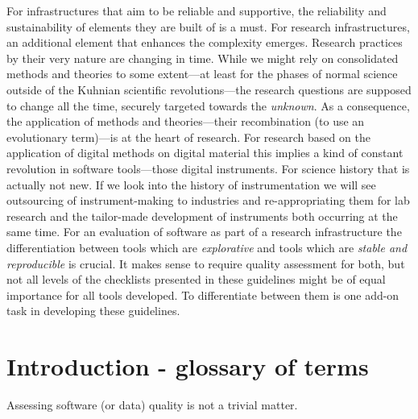 \documentclass[a4paper,11pt]{article}
\begin{document}
For infrastructures that aim to be reliable and supportive, the
reliability and sustainability of elements they are built of is a must.
For research infrastructures, an additional element that enhances the
complexity emerges. Research practices by their very nature are changing in time. While
we might rely on consolidated methods and theories to some extent---at least
for the phases of normal science outside of the Kuhnian scientific revolutions---the research questions are supposed to change all the time, securely targeted
towards the \textit{unknown}. As a consequence, the application of methods and
theories---their recombination (to use an evolutionary term)---is at the heart of
research. For research based on the application of digital methods on digital
material this implies a kind of constant revolution in software tools---those
digital instruments.  For science history that is actually not new. If we look
into the history of instrumentation we will see outsourcing of %
instrument-making to industries and re-appropriating them for lab research and
the tailor-made development of instruments both occurring at the same time.  For an
evaluation of software as part of a research infrastructure the
differentiation between tools which are \textit{explorative} and tools
which are \textit{stable and reproducible} is crucial. It makes sense to require
quality assessment for both, but not all levels of the
checklists presented in these guidelines might be of equal importance for all tools developed. To
differentiate between them is one add-on task in developing these guidelines. 

\section{Introduction - glossary of terms}

Assessing software (or data) quality is not a trivial matter. 
\end{document}

